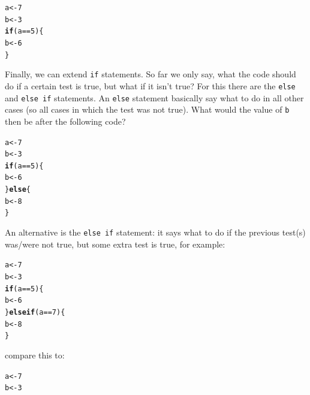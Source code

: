 \documentclass{article}\usepackage[]{graphicx}\usepackage[]{color}
\makeatletter
\newcommand{\hlnum}[1]{\textcolor[rgb]{0.686,0.059,0.569}{#1}}%
\newcommand{\hlopt}[1]{\textcolor[rgb]{0,0,0}{#1}}%
\newcommand{\hlstd}[1]{\textcolor[rgb]{0.345,0.345,0.345}{#1}}%
\newcommand{\hlkwa}[1]{\textcolor[rgb]{0.161,0.373,0.58}{\textbf{#1}}}%
\newcommand{\hlkwb}[1]{\textcolor[rgb]{0.69,0.353,0.396}{#1}}%
\newenvironment{kframe}{%
 \def\at@end@of@kframe{}%
 \ifinner\ifhmode%
  \def\at@end@of@kframe{\end{minipage}}%
  \begin{minipage}{\columnwidth}%
 \fi\fi%
 \def\FrameCommand##1{\hskip\@totalleftmargin \hskip-\fboxsep
 \colorbox{shadecolor}{##1}\hskip-\fboxsep
     \hskip-\linewidth \hskip-\@totalleftmargin \hskip\columnwidth}%
 \MakeFramed {\advance\hsize-\width
   \@totalleftmargin\z@ \linewidth\hsize
   \@setminipage}}%
 {\par\unskip\endMakeFramed%
 \at@end@of@kframe}
\newenvironment{knitrout}{}{} %
\makeatother
\begin{document}
\begin{mdframed}
\begin{knitrout}
\color{fgcolor}\begin{kframe}
\begin{alltt}
\hlstd{a} \hlkwb{<-} \hlnum{7}
\hlstd{b} \hlkwb{<-} \hlnum{3}
\hlkwa{if}\hlstd{(a} \hlopt{==} \hlnum{5}\hlstd{)\{}
  \hlstd{b} \hlkwb{<-} \hlnum{6}
\hlstd{\}}
\end{alltt}
\end{kframe}
\end{knitrout}
Finally, we can extend \texttt{if} statements. So far we only say, what the code should do if a certain test is true, but what if it isn't true? For this there are the \texttt{else} and \texttt{else if} statements. An \texttt{else} statement basically say what to do in all other cases (so all cases in which the test was not true). What would the value of \texttt{b} then be after the following code?
\begin{knitrout}
\color{fgcolor}\begin{kframe}
\begin{alltt}
\hlstd{a} \hlkwb{<-} \hlnum{7}
\hlstd{b} \hlkwb{<-} \hlnum{3}
\hlkwa{if}\hlstd{(a} \hlopt{==} \hlnum{5}\hlstd{)\{}
  \hlstd{b} \hlkwb{<-} \hlnum{6}
\hlstd{\}} \hlkwa{else}\hlstd{\{}
  \hlstd{b} \hlkwb{<-} \hlnum{8}
\hlstd{\}}
\end{alltt}
\end{kframe}
\end{knitrout}
An alternative is the \texttt{else if} statement: it says what to do if the previous test(s) was/were not true, but some extra test is true, for example:
\begin{knitrout}
\color{fgcolor}\begin{kframe}
\begin{alltt}
\hlstd{a} \hlkwb{<-} \hlnum{7}
\hlstd{b} \hlkwb{<-} \hlnum{3}
\hlkwa{if}\hlstd{(a} \hlopt{==} \hlnum{5}\hlstd{)\{}
  \hlstd{b} \hlkwb{<-} \hlnum{6}
\hlstd{\}} \hlkwa{else if}\hlstd{(a} \hlopt{==}\hlnum{7}\hlstd{)\{}
  \hlstd{b} \hlkwb{<-} \hlnum{8}
\hlstd{\}}
\end{alltt}
\end{kframe}
\end{knitrout}
compare this to:
\begin{knitrout}
\color{fgcolor}\begin{kframe}
\begin{alltt}
\hlstd{a} \hlkwb{<-} \hlnum{7}
\hlstd{b} \hlkwb{<-} \hlnum{3}

\end{alltt}
\end{kframe}
\end{knitrout}
\end{mdframed}
\end{document}
